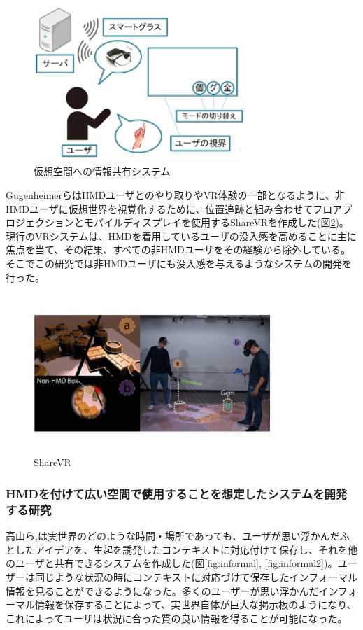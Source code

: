 \documentclass[11pt,a4j, titlepage]{jarticle} %
\begin{document}
\begin{figure}[H]
  \begin{center}
    \includegraphics[clip,height=6.0cm,width=8.0cm]{./kasoukuukan.eps}
    \caption{仮想空間への情報共有システム}
    \label{fig:kasoukuukan}
  \end{center}
\end{figure}

Gugenheimerら\cite{Gugenheimer}はHMDユーザとのやり取りやVR体験の一部となるように、非HMDユーザに仮想世界を視覚化するために、位置追跡と組み合わせてフロアプロジェクションとモバイルディスプレイを使用するShareVRを作成した(図\ref{fig:sharevr})。現行のVRシステムは、HMDを着用しているユーザの没入感を高めることに主に焦点を当て、その結果、すべての非HMDユーザをその経験から除外している。そこでこの研究では非HMDユーザにも没入感を与えるようなシステムの開発を行った。

\begin{figure}[H]
  \begin{center}
    \includegraphics[clip,height=6.0cm,width=9.0cm]{./sharevr.eps}
    \caption{ShareVR}
    \label{fig:sharevr}
  \end{center}
\end{figure}

\subsubsection{HMDを付けて広い空間で使用することを想定したシステムを開発する研究}
高山ら\cite{tano},\cite{tano2}は実世界のどのような時間・場所であっても、ユーザが思い浮かんだふとしたアイデアを、生起を誘発したコンテキストに対応付けて保存し、それを他のユーザと共有できるシステムを作成した(図\ref{fig:informal}, \ref{fig:informal2})。ユーザーは同じような状況の時にコンテキストに対応づけて保存したインフォーマル情報を見ることができるようになった。多くのユーザーが思い浮かんだインフォーマル情報を保存することによって、実世界自体が巨大な掲示板のようになり、これによってユーザは状況に合った質の良い情報を得ることが可能になった。
\end{document}
